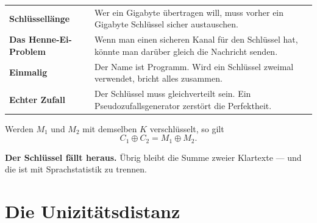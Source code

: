 \begin{warnung}
\begin{center}
{\small
\renewcommand{\arraystretch}{1.52}
\begin{tabular}{@{}P{2.4cm}P{6.2cm}@{}}
\toprule
\textbf{Schlüssellänge} & Wer ein Gigabyte übertragen will, muss vorher ein Gigabyte Schlüssel sicher austauschen.\\
\textbf{Das Henne-Ei-Problem} & Wenn man einen sicheren Kanal für den Schlüssel hat, könnte man darüber gleich die Nachricht senden.\\
\textbf{Einmalig} & Der Name ist Programm. Wird ein Schlüssel zweimal verwendet, bricht alles zusammen.\\
\textbf{Echter Zufall} & Der Schlüssel muss gleichverteilt sein. Ein Pseudozufallsgenerator zerstört die Perfektheit.\\
\bottomrule
\end{tabular}}
\end{center}

Werden $M_1$ und $M_2$ mit demselben $K$ verschlüsselt, so gilt
\[ C_1 \oplus C_2 = M_1 \oplus M_2 . \]

\begin{center}
\begin{minipage}{0.9\textwidth}
\textbf{Der Schlüssel fällt heraus.} Übrig bleibt die Summe zweier Klartexte --- und die ist mit Sprachstatistik zu trennen.
\end{minipage}
\end{center}

\begin{center}
\begin{minipage}{0.88\textwidth}
\end{minipage}
\end{center}
\end{warnung}

\section{Die Unizitätsdistanz}

